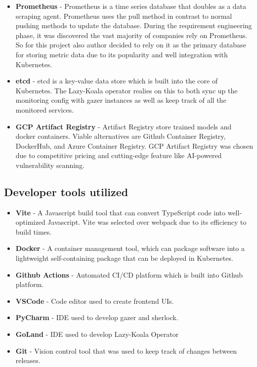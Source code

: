 \begin{itemize}
    \item \textbf{Prometheus} - Prometheus is a time series database that doubles as a data scraping agent. Prometheus uses the pull method in contrast to normal pushing methods to update the database. During the requirement engineering phase, it was discovered the vast majority of companies rely on Prometheus. So for this project also author decided to rely on it as the primary database for storing metric data due to its popularity and well integration with Kubernetes.
    \item \textbf{etcd} - etcd is a key-value data store which is built into the core of Kubernetes. The Lazy-Koala operator realies on this to both sync up the monitoring config with gazer instances as well as keep track of all the monitored services.
    \item \textbf{GCP Artifact Registry} - Artifact Registry store trained models and docker containers. Viable alternatives are Github Container Registry, DockerHub, and Azure Container Registry. GCP Artifact Registry was chosen due to competitive pricing and cutting-edge feature like AI-powered vulnerability scanning. 
\end{itemize}

\subsection{Developer tools utilized}
\begin{itemize}
    \item \textbf{Vite} - A Javascript build tool that can convert TypeScript code into well-optimized Javascript. Vite was selected over webpack due to its efficiency to build times.
    \item \textbf{Docker} - A container management tool, which can package software into a lightweight self-containing package that can be deployed in Kubernetes.
    \item \textbf{Github Actions} - Automated CI/CD platform which is built into Github platform.
    \item \textbf{VSCode} - Code editor used to create frontend UIs.
    \item \textbf{PyCharm} - IDE used to develop gazer and sherlock.
    \item \textbf{GoLand} - IDE used to develop Lazy-Koala Operator
    \item \textbf{Git} - Vision control tool that was used to keep track of changes between releases.
\end{itemize}

